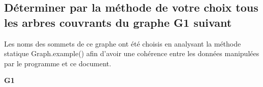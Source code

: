 \subsection{Déterminer par la méthode de votre choix tous les arbres couvrants du graphe G1 suivant}\label{subsec:Q1}

Les noms des sommets de ce graphe ont été choisis en analysant la méthode statique Graph.example()
afin d'avoir une cohérence entre les données manipulées par le programme et ce document.

\begin{center}

    \textbf{G1}

\end{center}

